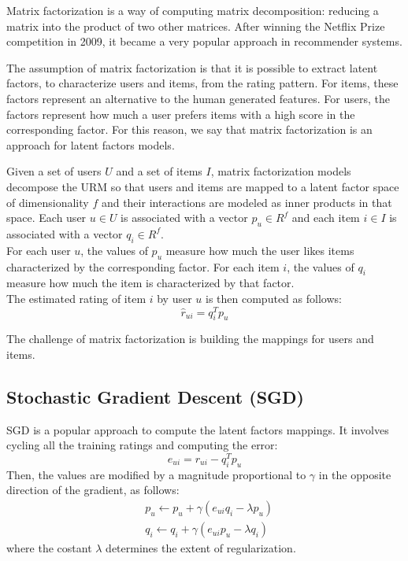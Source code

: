 Matrix factorization \cite{10.1109/MC.2009.263} is a way of computing matrix decomposition: reducing a matrix into the product of two other matrices. After winning the Netflix Prize competition in 2009, it became a very popular approach in recommender systems.\par
The assumption of matrix factorization is that it is possible to extract latent factors, to characterize users and items, from the rating pattern. For items, these factors represent an alternative to the human generated features. For users, the factors represent how much a user prefers items with a high score in the corresponding factor. For this reason, we say that matrix factorization is an approach for latent factors models.\par
Given a set of users $U$ and a set of items $I$, matrix factorization models decompose the URM so that users and items are mapped to a latent factor space of dimensionality $f$ and their interactions are modeled as inner products in that space. Each user $u \in U$ is associated with a vector $p_u \in R^f$ and each item $i \in I$ is associated with a vector $q_i \in R^f$.\\
For each user $u$, the values of $p_u$ measure how much the user likes items characterized by the corresponding factor. For each item $i$, the values of $q_i$ measure how much the item is characterized by that factor.\\
The estimated rating of item $i$ by user $u$ is then computed as follows:
\[ \hat{r}_{ui} = q_i^T p_u \]\par
The challenge of matrix factorization is building the mappings for users and items.


\subsection{Stochastic Gradient Descent (SGD)}

SGD is a popular approach \cite{ImprovingSVD, 10.1145/1401890.1401944, 10.1145/1345448.1345466} to compute the latent factors mappings. It involves cycling all the training ratings and computing the error:
\[ e_{ui} = r_{ui} - q_i^T p_u \]
Then, the values are modified by a magnitude proportional to $\gamma$ in the opposite direction of the gradient, as follows:
\begin{equation*}
\begin{split}
& p_u \leftarrow p_u + \gamma (e_{ui} q_i - \lambda p_u) \\
& q_i \leftarrow q_i + \gamma (e_{ui} p_u - \lambda q_i)
\end{split}
\end{equation*}
where the costant $\lambda$ determines the extent of regularization.



